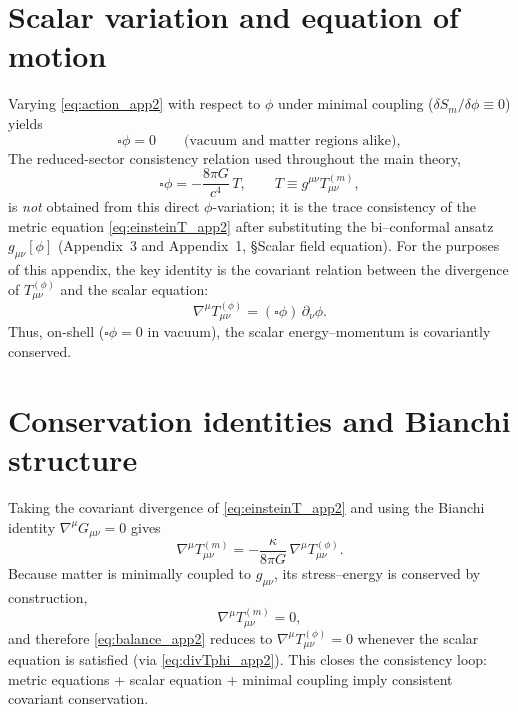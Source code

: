\documentclass[11pt]{article}
\begin{document}
\section{Scalar variation and equation of motion}\label{sec:scalarvar}
Varying \eqref{eq:action_app2} with respect to $\phi$ under minimal coupling ($\delta S_m/\delta\phi\equiv 0$) yields
\begin{equation}
\square\phi = 0 \qquad \text{(vacuum and matter regions alike)} ,
\label{eq:boxphi_app2}
\end{equation}
The reduced-sector consistency relation used throughout the main theory,
\begin{equation}
\square\phi = -\frac{8\pi G}{c^4}\,T,
\qquad T\equiv g^{\mu\nu}T^{(m)}_{\mu\nu},
\end{equation}
is \emph{not} obtained from this direct $\phi$-variation; it is the trace consistency of the metric equation \eqref{eq:einsteinT_app2} after substituting the bi--conformal ansatz $g_{\mu\nu}[\phi]$ (Appendix~3 and Appendix~1, §Scalar field equation). For the purposes of this appendix, the key identity is the covariant relation between the divergence of $T^{(\phi)}_{\mu\nu}$ and the scalar equation:
\begin{equation}
\nabla^\mu T^{(\phi)}_{\mu\nu} = (\square\phi)\,\partial_\nu\phi.
\label{eq:divTphi_app2}
\end{equation}
Thus, on-shell ($\square\phi=0$ in vacuum), the scalar energy--momentum is covariantly conserved.

\section{Conservation identities and Bianchi structure}\label{sec:cons_app2}
Taking the covariant divergence of \eqref{eq:einsteinT_app2} and using the Bianchi identity $\nabla^\mu G_{\mu\nu}=0$ gives
\begin{equation}
\nabla^\mu T^{(m)}_{\mu\nu} = -\frac{\kappa}{8\pi G}\,\nabla^\mu T^{(\phi)}_{\mu\nu}.
\label{eq:balance_app2}
\end{equation}
Because matter is minimally coupled to $g_{\mu\nu}$, its stress--energy is conserved by construction,
\begin{equation}
\nabla^\mu T^{(m)}_{\mu\nu}=0,
\label{eq:divTm}
\end{equation}
and therefore \eqref{eq:balance_app2} reduces to $\nabla^\mu T^{(\phi)}_{\mu\nu}=0$ whenever the scalar equation is satisfied (via \eqref{eq:divTphi_app2}). This closes the consistency loop: metric equations + scalar equation + minimal coupling imply consistent covariant conservation.
\end{document}
